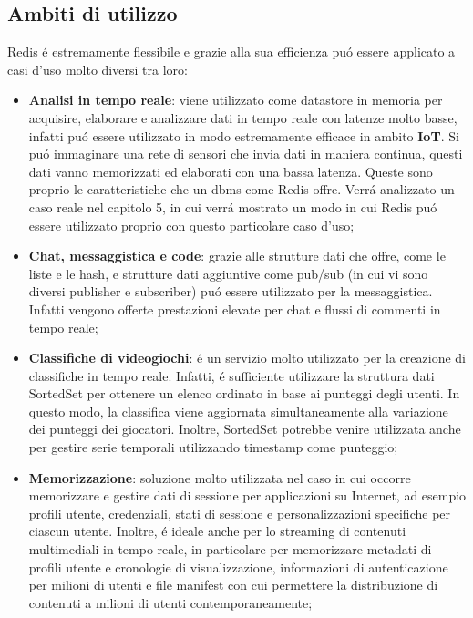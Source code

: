 \subsection{Ambiti di utilizzo}
Redis é estremamente flessibile e grazie alla sua efficienza puó essere applicato a casi d'uso molto diversi tra loro:
\begin{itemize}
    \item \textbf{Analisi in tempo reale}: viene utilizzato come datastore in memoria per acquisire, elaborare e analizzare dati in tempo reale
    con latenze molto basse, infatti puó essere utilizzato in modo estremamente efficace in ambito \textbf{IoT}. Si puó immaginare una rete di sensori che invia
    dati in maniera continua, questi dati vanno memorizzati ed elaborati con una bassa latenza. Queste sono proprio le caratteristiche che
    un dbms come Redis offre. Verrá analizzato un caso reale nel capitolo 5, in cui verrá mostrato un modo in cui Redis puó essere utilizzato proprio
    con questo particolare caso d'uso;
    \item \textbf{Chat, messaggistica e code}: grazie alle strutture dati che offre, come le liste e le hash, e strutture dati aggiuntive come pub/sub
    (in cui vi sono diversi publisher e subscriber) puó essere utilizzato per la messaggistica. Infatti vengono offerte prestazioni elevate per
    chat e flussi di commenti in tempo reale;
    \item \textbf{Classifiche di videogiochi}: é un servizio molto utilizzato per la creazione di classifiche in tempo reale. Infatti, é
    sufficiente utilizzare la struttura dati SortedSet per ottenere un elenco ordinato in base ai punteggi degli utenti. In questo modo, la classifica
    viene aggiornata simultaneamente alla variazione dei punteggi dei giocatori. Inoltre, SortedSet potrebbe venire utilizzata anche per gestire
    serie temporali utilizzando timestamp come punteggio;
    \item \textbf{Memorizzazione}: soluzione molto utilizzata nel caso in cui occorre memorizzare e gestire dati di sessione per applicazioni su
    Internet, ad esempio profili utente, credenziali, stati di sessione e personalizzazioni specifiche per ciascun utente. Inoltre, é ideale anche
    per lo streaming di contenuti multimediali in tempo reale, in particolare per memorizzare metadati di profili utente e cronologie di visualizzazione,
    informazioni di autenticazione per milioni di utenti e file manifest con cui permettere la distribuzione di contenuti a milioni di utenti
    contemporaneamente;

\end{itemize}
